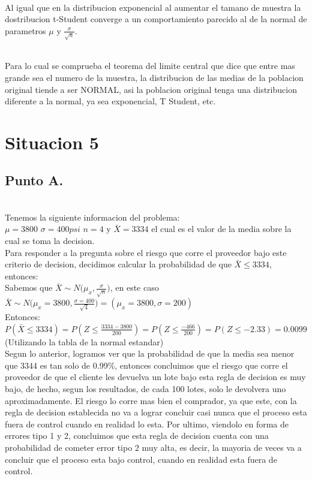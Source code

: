 \documentclass[letterpaper,12pt,onecolumn,titlepage]{article}
\begin{document}
~\\Al igual que en la distribucion exponencial al aumentar el tamano de muestra la dostribucion t-Student converge a un comportamiento parecido al de la normal de parametros $\mu$ y $\frac{\sigma}{\sqrt{n}}$. 

~\\Para lo cual se comprueba el teorema del limite central que dice que entre mas grande sea el numero de la muestra, la distribucion de las medias de la poblacion original tiende a ser NORMAL, asi la poblacion original tenga una distribucion diferente a la normal, ya sea exponencial, T Student, etc.

\pagebreak\section{Situacion 5}
\subsection{Punto A.}
~\\ Tenemos la siguiente informacion del problema:
~\\ $\mu=3800$  $\sigma=400psi$ $n=4$ y $\bar{X}=3334$ el cual es el valor de la media sobre la cual se toma la decision.
~\\ Para responder a la pregunta sobre el riesgo que corre el proveedor bajo este criterio de decision, decidimos calcular la probabilidad de que $\bar{X}\leq3334$, entonces:
~\\ Sabemos que $\bar{X}\sim{N(\mu_x,\frac{\sigma}{\sqrt{n}}})$, en este caso $\bar{X}\sim{N(\mu_x=3800,\frac{\sigma=400}{\sqrt{4}}})=(\mu_x=3800,\sigma=200)$
~\\Entonces:
~\\ $P(\bar{X}\leq3334)=P(Z\leq\frac{3334-3800}{200})=P(Z\leq\frac{-466}{200})=P(Z\leq-2.33)=0.0099$ (Utilizando la tabla de la normal estandar)
~\\Segun lo anterior, logramos ver que la probabilidad de que la media sea menor que 3344 es tan solo de 0.99\%, entonces concluimos que el riesgo que corre el proveedor de que el cliente les devuelva un lote bajo esta regla de decision es muy bajo, de hecho, segun los resultados, de cada 100 lotes, solo le devolvera uno aproximadamente. El riesgo lo corre mas bien el comprador, ya que este, con la regla de decision establecida no va a lograr concluir casi nunca que el proceso esta fuera de control cuando en realidad lo esta. Por ultimo, viendolo en forma de errores tipo 1 y 2, concluimos que esta regla de decision cuenta con una probabilidad de cometer error tipo 2 muy alta, es decir, la mayoria de veces va a concluir que el proceso esta bajo control, cuando en realidad esta fuera de control.
\end{document}
